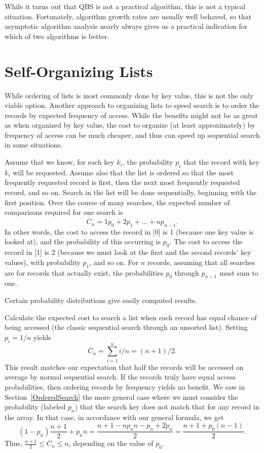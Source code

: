 While it turns out that QBS is not a practical algorithm,
this is not a typical situation.
Fortunately, algorithm growth rates are usually well behaved, so that
asymptotic algorithm analysis nearly always gives us a practical
indication for which of two algorithms is better.

\section{Self-Organizing Lists}
\label{SelfOrg}

While ordering of lists is most commonly done by key value,
this is not the only viable option.
Another approach to organizing lists to speed search is to order the
records by expected frequency of access.
While the benefits might not be as great as when organized by key
value, the cost to organize (at least approximately) by frequency of
access can be much cheaper,
and thus can speed up sequential search in some situations.

Assume that we know, for each key \(k_i\), the probability \(p_i\) that
the record with key \(k_i\) will be requested.
Assume also that the list is ordered so that the most frequently
requested record is first, then the next most frequently requested
record, and so on.
Search in the list will be done sequentially, beginning with the
first position.
Over the course of many searches, the expected number of comparisons
required for one search is
\[ \overline{C}_n = 1 p_0 + 2 p_1 + ... + n p_{n-1}. \]
\noindent In other words, the cost to access the record in
[0] is 1 (because one key value is looked at), and the
probability of this occurring is \(p_0\).
The cost to access the record in [1] is 2 (because
we must look at the first and the second records' key values),
with probability \(p_1\), and so on.
For \(n\) records, assuming that all searches are
for records that actually exist, the probabilities \(p_0\) through
\(p_{n-1}\) must sum to one.

Certain probability distributions give easily computed results.

\begin{example}
Calculate the expected cost to search a list
when each record has equal chance of being accessed (the classic
sequential search through an unsorted list).
Setting \(p_i = 1/n\) yields
\[ \overline{C}_n = \sum_{i=1}^n i/n = (n+1)/2.\]
This result matches our expectation that half the records will be
accessed on average by normal sequential search.
If the records truly have equal access probabilities, then ordering
records by frequency yields no benefit.
We saw in Section~\ref{OrderedSearch} the more general case where we
must consider the probability (labeled \(p_n\)) that the search key
does not match that for any record in the array.
In that case, in accordance with our general formula, we get
\[ (1-p_n) \frac{n+1}{2} + p_n n = 
\frac{n + 1 - n p_n n - p_n + 2 p_n}{2} =
\frac{n + 1 + p_0 (n - 1)}{2}.\]
\noindent Thus, \(\frac{n+1}{2} \leq \overline{C}_n \leq n\),
depending on the value of \(p_0\).
\end{example}

